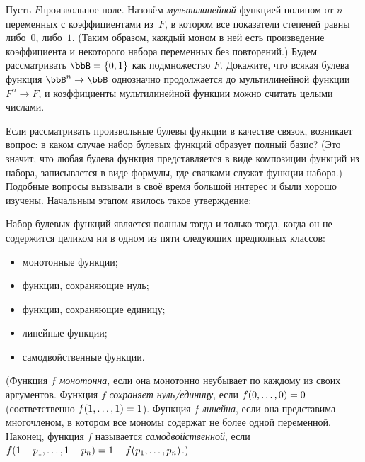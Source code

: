 \begin{problem}
Пусть $F$\т произвольное поле.%
Назовём \emph{мультилинейной}%
%
функцией полином от $n$ переменных с коэффициентами из~$F$, в
котором все показатели степеней равны либо~$0$, либо~$1$. (Таким
образом, каждый моном в ней есть произведение коэффициента и
некоторого набора переменных без повторений.) Будем
рассматривать $\bbB=\{0,1\}$ как подмножество $F$. Докажите, что
всякая булева функция $\bbB^n\to\bbB$ однозначно продолжается до
мультилинейной функции $F^n\to F$, и коэффициенты
мультилинейной функции можно считать целыми числами.
\end{problem}

Если рассматривать произвольные булевы функции в качестве
связок, возникает вопрос: в каком случае набор булевых функций
образует полный базис? (Это значит, что любая булева функция
представляется в виде композиции функций из набора, 
записывается в виде формулы, где связками служат функции
набора.) Подобные вопросы вызывали в своё время большой интерес
и были хорошо изучены. Начальным этапом явилось такое
утверждение:

\begin{theorem}
%
%
Набор булевых функций является полным тогда и только тогда,
когда он не содержится целиком
ни в одном из пяти следующих
 предполных классов:%
\begin{itemize}
\item монотонные функции;
\item функции, сохраняющие нуль;
\item функции, сохраняющие единицу;
\item линейные функции;
\item самодвойственные функции.
\end{itemize}
(Функция $f$ \emph{монотонна},%
%
если она монотонно неубывает по
каждому из своих аргументов. Функция $f$ \emph{сохраняет
нуль\emph/единицу},%
если $f(0,\dots,0)\hm=0$ (соответственно
$f(1,\dots,1)\hm=1$). Функция $f$ \emph{линейна},%
%
если она
представима многочленом, в котором все мономы содержат не более
одной переменной. Наконец, функция $f$ называется
\emph{самодвойственной},%
%
если
$f(1-p_1,\dots,1-p_n)\hm=1-f(p_1,\dots,p_n)$.)
\end{theorem}

